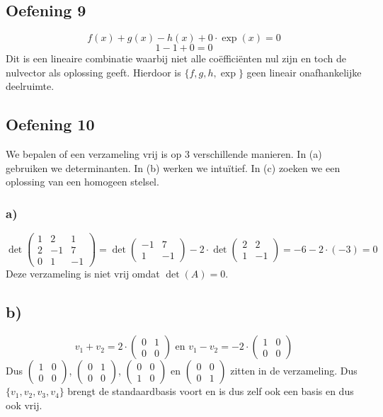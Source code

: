 \documentclass[lineaire_algebra_oplossingen.tex]{subfiles}
\begin{document}
\subsection{Oefening 9}
$$f(x)+g(x)-h(x)+0\cdot \exp(x) = 0$$
$$1 - 1 + 0 = 0$$
Dit is een lineaire combinatie waarbij niet alle co\"effici\"enten nul zijn en toch de nulvector als oplossing geeft. Hierdoor is $\{f,g,h,\exp\}$ geen lineair onafhankelijke deelruimte.

\subsection{Oefening 10}
We bepalen of een verzameling vrij is op 3 verschillende manieren. In (a) gebruiken we determinanten. In (b) werken we intu\"itief. In (c) zoeken we een oplossing van een homogeen stelsel.
\subsubsection*{a)}
\[
\det
\begin{pmatrix}
1 &  2 &  1 \\
2 & -1 &  7 \\
0 &  1 & -1
\end{pmatrix}
= \det
\begin{pmatrix}
-1 &  7 \\
 1 & -1
\end{pmatrix}
- 2 \cdot \det
\begin{pmatrix}
2 &  2 \\
1 & -1
\end{pmatrix}
= -6-2 \cdot (-3) = 0
\]
Deze verzameling is niet vrij omdat $\det(A) = 0$.

\subsection*{b)}
\[
v_1+v_2 = 2 \cdot
\begin{pmatrix}
0 & 1 \\
0 & 0
\end{pmatrix}
\text{ en }
v_1 - v_2 = -2 \cdot
\begin{pmatrix}
1 & 0 \\
0 & 0
\end{pmatrix}
\]
Dus $\begin{pmatrix}
1 & 0 \\
0 & 0
\end{pmatrix}$,
$\begin{pmatrix}
0 & 1 \\
0 & 0
\end{pmatrix}$,
$\begin{pmatrix}
0 & 0 \\
1 & 0
\end{pmatrix}$ en
$\begin{pmatrix}
0 & 0 \\
0 & 1
\end{pmatrix}$ zitten in de verzameling. Dus $\{v_1,v_2,v_3,v_4\}$ brengt de standaardbasis voort en is dus zelf ook een basis en dus ook vrij.
\end{document}
